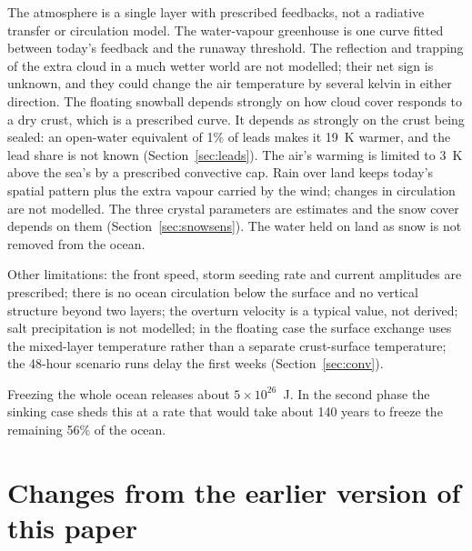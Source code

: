 \documentclass[11pt,a4paper]{article}
\begin{document}
The atmosphere is a single layer with prescribed feedbacks, not a radiative transfer or circulation model. The water-vapour greenhouse is one curve fitted between today's feedback and the runaway threshold. The reflection and trapping of the extra cloud in a much wetter world are not modelled; their net sign is unknown, and they could change the air temperature by several kelvin in either direction. The floating snowball depends strongly on how cloud cover responds to a dry crust, which is a prescribed curve. It depends as strongly on the crust being sealed: an open-water equivalent of 1\% of leads makes it 19~K warmer, and the lead share is not known (Section~\ref{sec:leads}). The air's warming is limited to 3~K above the sea's by a prescribed convective cap. Rain over land keeps today's spatial pattern plus the extra vapour carried by the wind; changes in circulation are not modelled. The three crystal parameters are estimates and the snow cover depends on them (Section~\ref{sec:snowsens}). The water held on land as snow is not removed from the ocean.

Other limitations: the front speed, storm seeding rate and current amplitudes are prescribed; there is no ocean circulation below the surface and no vertical structure beyond two layers; the overturn velocity is a typical value, not derived; salt precipitation is not modelled; in the floating case the surface exchange uses the mixed-layer temperature rather than a separate crust-surface temperature; the 48-hour scenario runs delay the first weeks (Section~\ref{sec:conv}).

Freezing the whole ocean releases about $5\times10^{26}$~J. In the second phase the sinking case sheds this at a rate that would take about 140 years to freeze the remaining 56\% of the ocean.

\section{Changes from the earlier version of this paper}
\end{document}
